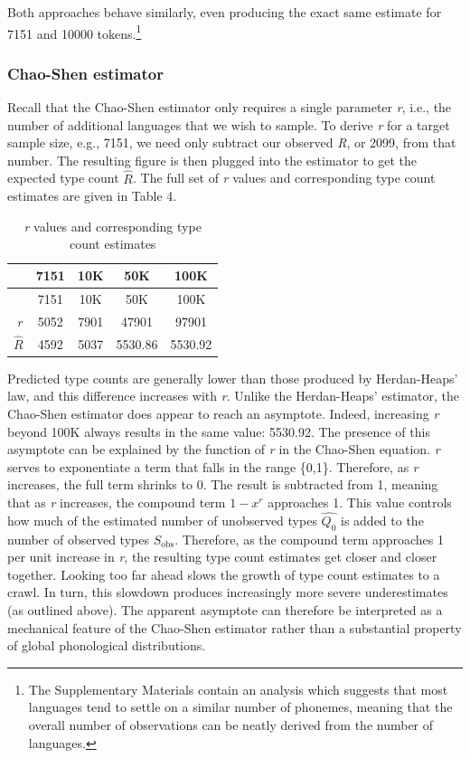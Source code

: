 \documentclass[
]{article}
\begin{document}
Both approaches behave similarly, even producing the exact same estimate
for 7151 and 10000 tokens.\footnote{The Supplementary Materials contain
  an analysis which suggests that most languages tend to settle on a
  similar number of phonemes, meaning that the overall number of
  observations can be neatly derived from the number of languages.}

\hypertarget{chao-shen-estimator}{%
\subsubsection{Chao-Shen estimator}\label{chao-shen-estimator}}

Recall that the Chao-Shen estimator only requires a single parameter
\emph{r}, i.e., the number of additional languages that we wish to
sample. To derive \emph{r} for a target sample size, e.g., 7151, we need
only subtract our observed \emph{R}, or 2099, from that number. The
resulting figure is then plugged into the estimator to get the expected
type count \(\hat{R}\). The full set of \emph{r} values and
corresponding type count estimates are given in Table 4.

\begin{longtable}[]{@{}rcccc@{}}
\caption{\emph{r} values and corresponding type count
estimates}\tabularnewline
\toprule\noalign{}
& 7151 & 10K & 50K & 100K \\
\midrule\noalign{}
\endfirsthead
\toprule\noalign{}
& 7151 & 10K & 50K & 100K \\
\midrule\noalign{}
\endhead
\bottomrule\noalign{}
\endlastfoot
\(r\) & 5052 & 7901 & 47901 & 97901 \\
\(\hat{R}\) & 4592 & 5037 & 5530.86 & 5530.92 \\
\end{longtable}

Predicted type counts are generally lower than those produced by
Herdan-Heaps' law, and this difference increases with \emph{r}. Unlike
the Herdan-Heaps' estimator, the Chao-Shen estimator does appear to
reach an asymptote. Indeed, increasing \emph{r} beyond 100K always
results in the same value: 5530.92. The presence of this asymptote can
be explained by the function of \emph{r} in the Chao-Shen equation.
\emph{r} serves to exponentiate a term that falls in the range \{0,1\}.
Therefore, as \emph{r} increases, the full term shrinks to 0. The result
is subtracted from 1, meaning that as \emph{r} increases, the compound
term \(1-x^r\) approaches 1. This value controls how much of the
estimated number of unobserved types \(\hat{Q_0}\) is added to the
number of observed types \(S_{\text{obs}}\). Therefore, as the compound
term approaches 1 per unit increase in \emph{r}, the resulting type
count estimates get closer and closer together. Looking too far ahead
slows the growth of type count estimates to a crawl. In turn, this
slowdown produces increasingly more severe underestimates (as outlined
above). The apparent asymptote can therefore be interpreted as a
mechanical feature of the Chao-Shen estimator rather than a substantial
property of global phonological distributions.
\end{document}
